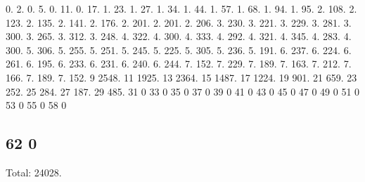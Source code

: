 0. 2. 0. 5. 0. 11. 0. 17. 1. 23. 1. 27. 1. 34. 1. 44. 1. 57. 1. 68. 1. 94. 1. 95. 2. 108. 2. 123. 2. 135. 2. 141. 2. 176. 2. 201. 2. 201. 2. 206. 3. 230. 3. 221. 3. 229. 3. 281. 3. 300. 3. 265. 3. 312. 3. 248. 4. 322. 4. 300. 4. 333. 4. 292. 4. 321. 4. 345. 4. 283. 4. 300. 5. 306. 5. 255. 5. 251. 5. 245. 5. 225. 5. 305. 5. 236. 5. 191. 6. 237. 6. 224. 6. 261. 6. 195. 6. 233. 6. 231. 6. 240. 6. 244. 7. 152. 7. 229. 7. 189. 7. 163. 7. 212. 7. 166. 7. 189. 7. 152. 9 2548. 11 1925. 13 2364. 15 1487. 17 1224. 19 901. 21 659. 23 252. 25 284. 27 187. 29 485. 31 0 33 0 35 0 37 0 39 0 41 0 43 0 45 0 47 0 49 0 51 0 53 0 55 0 58 0 \subsection*{62 0 }

Total\+: 24028. 